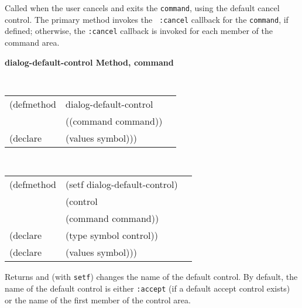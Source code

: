 \begin{flushright} \parbox[t]{6.125in}{Called when the user cancels and exits the
{\tt command}, using the default cancel control. The primary method invokes the {\tt
:cancel} callback
for the {\tt command}, if defined; otherwise, the {\tt :cancel} callback is invoked
for each member of the command area. }\end{flushright}

{\samepage
{\large {\bf dialog-default-control \hfill Method, command}}
\begin{flushright} \parbox[t]{6.125in}{
\tt
\begin{tabular}{lll}
\raggedright
(defmethod & dialog-default-control & \\
& ((command  command))\\
(declare &(values symbol)))
\end{tabular}
\rm

}\end{flushright}}

{\samepage
\begin{flushright} \parbox[t]{6.125in}{
\tt
\begin{tabular}{lll}
\raggedright
(defmethod & (setf dialog-default-control) & \\
         & (control \\
         & (command command)) \\
(declare &(type symbol  control))\\
(declare &(values symbol)))
\end{tabular}
\rm
}
\end{flushright}}



\begin{flushright} \parbox[t]{6.125in}{Returns and (with {\tt setf}) changes
the name of the default control. 
By default, the name of the default control is either {\tt :accept} (if a
default accept control exists) or the name of the first member of the control
area.} \end{flushright}

